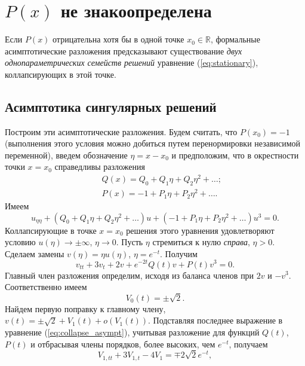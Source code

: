 \section{$P(x)$ не знакоопределена}

Если $P(x)$ отрицательна хотя бы в одной точке $x_0 \in \mathbb{R}$, формальные асимптотические разложения предсказывают существование {\it двух однопараметрических семейств решений} уравнение (\ref{eq:stationary}), коллапсирующих в этой точке.

\subsection{Асимптотика сингулярных решений}

Построим эти асимптотические разложения.
Будем считать, что $P(x_0)=-1$ (выполнения этого условия можно добиться путем перенормировки независимой переменной), введем обозначение $\eta = x - x_0$ и предположим, что в окрестности точки $x = x_0$ справедливы разложения
%
\begin{eqnarray}
&& Q(x) = Q_0 + Q_1 \eta + Q_2 \eta^2 + \dots; \\
&& P(x) = -1 + P_1 \eta + P_2 \eta^2 + \dots.
\end{eqnarray}
%
Имеем
%
\begin{equation}
u_{\eta\eta} + (Q_0 + Q_1 \eta + Q_2 \eta^2 + \dots)u + (-1 + P_1 \eta + P_2 \eta^2 + \dots)u^3 = 0.
\end{equation}
%
Коллапсирующие в точке $x = x_0$ решения этого уравнения удовлетворяют условию $u(\eta) \to \pm \infty$, $\eta \to 0$.
Пусть $\eta$ стремиться к нулю {\it справа}, $\eta > 0$.
Сделаем замены $v(\eta) = \eta u(\eta)$, $\eta = e^{-t}$.
Получим
%
\begin{equation}
v_{tt} + 3v_t + 2v + e^{-2t}Q(t)v + P(t)v^3 = 0.
\label{eq:collapse_asympt}
\end{equation}
%
Главный член разложения определим, исходя из баланса членов при $2v$ и $-v^3$.
Соответственно имеем
%
\begin{equation}
V_0(t) = \pm \sqrt{2}.
\label{eq:V0}
\end{equation}
%
Найдем первую поправку к главному члену, $v(t) = \pm \sqrt{2} + V_1(t) + o(V_1(t))$.
Подставляя последнее выражение в уравнение (\ref{eq:collapse_asympt}), учитывая разложение для функций $Q(t)$, $P(t)$ и отбрасывая члены порядков, более высоких, чем $e^{-t}$, получаем
%
\begin{equation}
V_{1,tt} + 3V_{1,t} - 4V_1 = \mp 2 \sqrt{2} e^{-t},
\end{equation}
